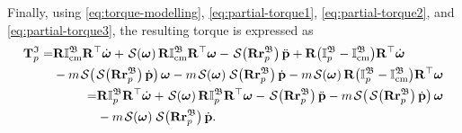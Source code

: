 Finally, using \eqref{eq:torque-modelling}, \eqref{eq:partial-torque1}, \eqref{eq:partial-torque2}, and \eqref{eq:partial-torque3}, the resulting torque is expressed as
\begin{align}
    \begin{split}
        \mathbf{T}^\mathfrak{I}_p = &\mathbf{R}\mathbb{I}^\mathfrak{B}_\text{cm}\mathbf{R}^\top\dot{\boldsymbol{\omega}} + \SL[\boldsymbol{\omega}]\mathbf{R}\mathbb{I}^\mathfrak{B}_\text{cm}\mathbf{R}^\top\boldsymbol{\omega} - \SL[\mathbf{R}\mathbf{r}^\mathfrak{B}_p]\ddot{\mathbf{p}} + \mathbf{R}\bigl(\mathbb{I}^\mathfrak{B}_p - \mathbb{I}^\mathfrak{B}_\text{cm}\bigr)\mathbf{R}^\top\dot{\boldsymbol{\omega}} \\
        &-m\SL[\SL[\mathbf{R}\mathbf{r}_p^\mathfrak{B}]\dot{\mathbf{p}}]\boldsymbol{\omega}
        -m\SL[\boldsymbol{\omega}]\SL[\mathbf{R}\mathbf{r}_p^\mathfrak{B}]\dot{\mathbf{p}}
        - m\SL[\boldsymbol{\omega}]\mathbf{R}\bigl(\mathbb{I}^\mathfrak{B}_p-\mathbb{I}^\mathfrak{B}_\text{cm}\bigr)\mathbf{R}^\top\boldsymbol{\omega}
    \end{split}\\
    \begin{split}
        = &\mathbf{R}\mathbb{I}^\mathfrak{B}_p\mathbf{R}^\top\dot{\boldsymbol{\omega}} + \SL[\boldsymbol{\omega}]\mathbf{R}\mathbb{I}^\mathfrak{B}_p\mathbf{R}^\top\boldsymbol{\omega} - \SL[\mathbf{R}\mathbf{r}^\mathfrak{B}_p]\ddot{\mathbf{p}} -m\SL[\SL[\mathbf{R}\mathbf{r}_p^\mathfrak{B}]\dot{\mathbf{p}}]\boldsymbol{\omega}\\
        &-m\SL[\boldsymbol{\omega}]\SL[\mathbf{R}\mathbf{r}_p^\mathfrak{B}]\dot{\mathbf{p}}.
    \end{split}
\end{align}


